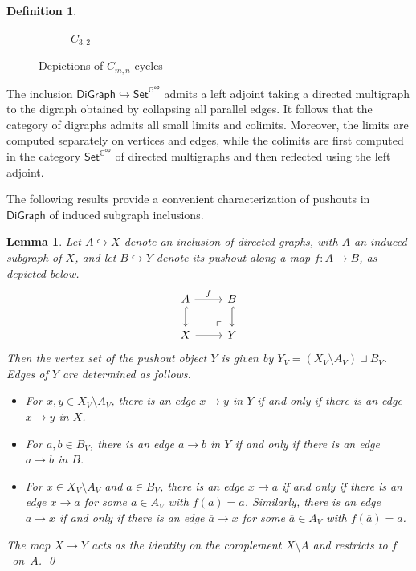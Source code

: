 \documentclass[11pt]{article}
\newtheorem{lemma}[theo]{Lemma}
\theoremstyle{definition}
\newtheorem{defi}[theo]{Definition}
\numberwithin{equation}{section}
\newcommand{\Set}{\mathsf{Set}}
\newcommand{\DiGraph}{\mathsf{DiGraph}}
\newcommand{\pushout}{\arrow [dr, phantom, "\ulcorner" very near end]}
\newcommand{\op}{\mathsf{op}}
\newcommand{\into}{\hookrightarrow}
\begin{document}
\begin{defi}
\begin{figure}[H]
\begin{subfigure}[b]{0.3\textwidth}
            \caption{$C_{3,2}$}
            \label{fig:3-2cycle}
        \end{subfigure}    
        \caption{Depictions of $C_{m,n}$ cycles}
    \end{figure}   
\end{defi}
The inclusion $\DiGraph \into \Set^{\mathbb{G}^\op}$ admits a left adjoint taking a directed multigraph to the digraph obtained by collapsing all parallel edges.
It follows that the category of digraphs admits all small limits and colimits.
Moreover, the limits are computed separately on vertices and edges, while the colimits are first computed in the category $\Set^{\mathbb{G}^\op}$ of directed multigraphs and then reflected using the left adjoint.

The following results provide a convenient characterization of pushouts in $\DiGraph$ of induced subgraph inclusions.

\begin{lemma}\label{pushout-char}
Let $A \hookrightarrow X$ denote an inclusion of directed graphs, with $A$ an induced subgraph of $X$, and let $B \hookrightarrow Y$ denote its pushout along a map $f \colon A \to B$, as depicted below.
\[
\begin{tikzcd}
A \arrow[r,"f",above] \arrow[d,hook] \pushout & B \arrow[d,hook] \\
X \arrow[r] & Y
\end{tikzcd}
\]
Then the vertex set of the pushout object $Y$ is given by $Y_V = (X_V \setminus A_V) \sqcup B_V$. 
Edges of $Y$ are determined as follows.
\begin{itemize}
    \item For  $x, y \in X_V \setminus A_V$, there is an edge $x \to y$ in $Y$ if and only if there is an edge $x \to y$ in $X$.
    \item For $a, b \in B_V$, there is an edge $a \to b$ in $Y$ if and only if there is an edge $a \to b$ in $B$.
    \item For $x \in X_V \setminus A_V$ and $a \in B_V$, there is an edge $x \to a$ if and only if there is an edge $x \to \overline{a}$ for some $\overline{a} \in A_V$ with $f(\overline{a}) = a$. 
    Similarly, there is an edge $a \to x$ if and only if there is an edge $\overline{a} \to x$ for some $\overline{a} \in A_V$ with $f(\overline{a}) = a$.
\end{itemize}
The map $X \to Y$ acts as the identity on the complement $X \setminus A$ and restricts to $f$~on~$A$. \qed
\end{lemma}
\end{document}
